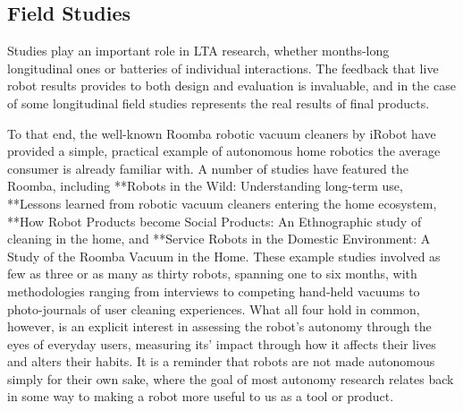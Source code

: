 \documentclass{sfuthesis}
\begin{document}











\subsection{Field Studies}

Studies play an important role in LTA research, whether months-long longitudinal ones or batteries of individual interactions. The feedback that live robot results provides to both design and evaluation is invaluable, and in the case of some longitudinal field studies represents the real results of final products.

To that end, the well-known Roomba robotic vacuum cleaners by iRobot have provided a simple, practical example of autonomous home robotics the average consumer is already familiar with. A number of studies have featured the Roomba, including **Robots in the Wild: Understanding long-term use, **Lessons learned from robotic vacuum cleaners entering the home ecosystem, **How Robot Products become Social Products: An Ethnographic study of cleaning in the home, and **Service Robots in the Domestic Environment: A Study of the Roomba Vacuum in the Home. These example studies involved as few as three or as many as thirty robots, spanning one to six months, with methodologies ranging from interviews to competing hand-held vacuums to photo-journals of user cleaning experiences. What all four hold in common, however, is an explicit interest in assessing the robot's autonomy through the eyes of everyday users, measuring its' impact through how it affects their lives and alters their habits. It is a reminder that robots are not made autonomous simply for their own sake, where the goal of most autonomy research relates back in some way to making a robot more useful to us as a tool or product.
\end{document}
